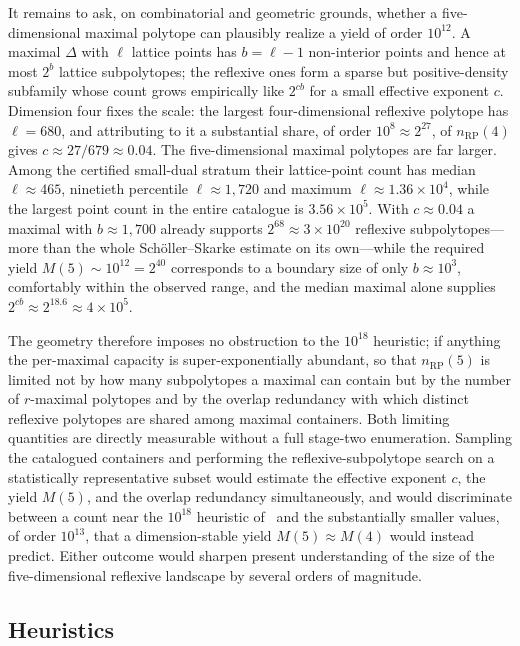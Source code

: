 \documentclass[appliedmath,article,submit,moreauthors]{Definitions/mdpi}
\begin{document}
It remains to ask, on combinatorial and geometric grounds, whether a
five-dimensional maximal polytope can plausibly realize a yield of order
\(10^{12}\). A maximal \(\Delta\) with \(\ell\) lattice points has \(b=\ell-1\)
non-interior points and hence at most \(2^{b}\) lattice subpolytopes; the
reflexive ones form a sparse but positive-density subfamily whose count grows
empirically like \(2^{cb}\) for a small effective exponent \(c\). Dimension four
fixes the scale: the largest four-dimensional reflexive polytope has
\(\ell=680\), and attributing to it a substantial share, of order
\(10^{8}\approx2^{27}\), of \(n_{\mathrm{RP}}(4)\) gives
\(c\approx27/679\approx0.04\). The five-dimensional maximal polytopes are far
larger. Among the certified small-dual stratum their lattice-point count has
median \(\ell\approx465\), ninetieth percentile \(\ell\approx1{,}720\) and
maximum \(\ell\approx1.36\times10^{4}\), while the largest point count in the
entire catalogue is \(3.56\times10^{5}\). With \(c\approx0.04\) a maximal with
\(b\approx1{,}700\) already supports \(2^{68}\approx3\times10^{20}\) reflexive
subpolytopes---more than the whole Sch\"oller--Skarke estimate on its
own---while the required yield \(M(5)\sim10^{12}=2^{40}\) corresponds to a
boundary size of only \(b\approx10^{3}\), comfortably within the observed range,
and the median maximal alone supplies
\(2^{cb}\approx2^{18.6}\approx4\times10^{5}\).

The geometry therefore imposes no obstruction to the \(10^{18}\) heuristic; if
anything the per-maximal capacity is super-exponentially abundant, so that
\(n_{\mathrm{RP}}(5)\) is limited not by how many subpolytopes a maximal can
contain but by the number of \(r\)-maximal polytopes and by the overlap
redundancy with which distinct reflexive polytopes are shared among maximal
containers. Both limiting quantities are directly measurable without a full
stage-two enumeration. Sampling the catalogued containers and performing the
reflexive-subpolytope search on a statistically representative subset would
estimate the effective exponent \(c\), the yield \(M(5)\), and the overlap
redundancy simultaneously, and would discriminate between a count near the
\(10^{18}\) heuristic of~\cite{Scholler2019} and the substantially smaller
values, of order \(10^{13}\), that a dimension-stable yield \(M(5)\approx M(4)\)
would instead predict. Either outcome would sharpen present understanding of the
size of the five-dimensional reflexive landscape by several orders of magnitude.

\subsection{Heuristics}
\label{sec:discussion-heuristics}
\end{document}

